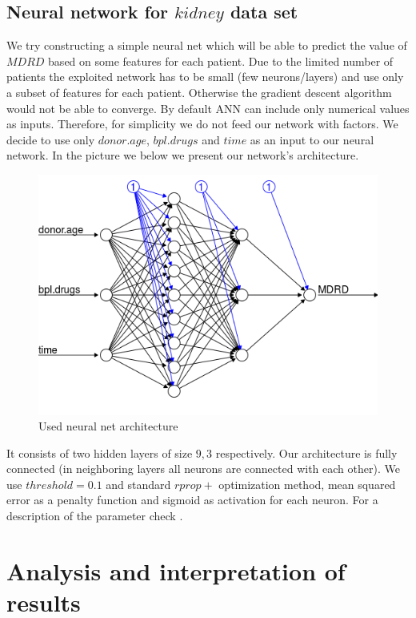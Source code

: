 \documentclass[num-refs]{wiley-article}
\begin{document}
\subsection{Neural network for $kidney$ data set}

We try constructing a simple neural net which will be able to predict the value of $MDRD$ based on some features for each patient. Due to the limited number of patients the exploited network has to be small (few neurons/layers) and use only a subset of features for each patient. Otherwise the gradient descent algorithm would not be able to converge. By default ANN can include only numerical values as inputs. Therefore, for simplicity we do not feed our network with factors. We decide to use only $donor.age$, $bpl.drugs$ and $time$ as an input to our neural network. In the picture we below we present our network's architecture.

\begin{figure}[H]
\centering
\includegraphics[width=\textwidth]{pictures/nn.png}
\caption{Used neural net architecture}
\end{figure}

It consists of two hidden layers of size $9,3$ respectively. Our architecture is fully connected (in neighboring layers all neurons are connected with each other). We use $threshold=0.1$ and standard $rprop+$ optimization method, mean squared error as a penalty function and sigmoid as activation for each neuron. For a description of the parameter check \cite{nn_pack}.

\section{Analysis and interpretation of results} \label{asses}
\end{document}
